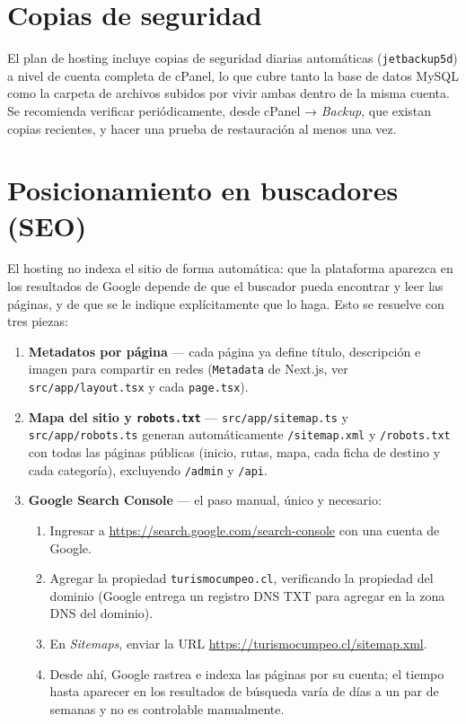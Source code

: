 \documentclass[11pt,a4paper]{article}
\begin{document}
\section{Copias de seguridad}

El plan de hosting incluye copias de seguridad diarias automáticas (\texttt{jetbackup5d}) a nivel de cuenta completa de cPanel, lo que cubre tanto la base de datos MySQL como la carpeta de archivos subidos por vivir ambas dentro de la misma cuenta. Se recomienda verificar periódicamente, desde cPanel → \emph{Backup}, que existan copias recientes, y hacer una prueba de restauración al menos una vez.

\section{Posicionamiento en buscadores (SEO)}

El hosting no indexa el sitio de forma automática: que la plataforma aparezca en los resultados de Google depende de que el buscador pueda encontrar y leer las páginas, y de que se le indique explícitamente que lo haga. Esto se resuelve con tres piezas:

\begin{enumerate}
  \item \textbf{Metadatos por página} — cada página ya define título, descripción e imagen para compartir en redes (\texttt{Metadata} de Next.js, ver \texttt{src/app/layout.tsx} y cada \texttt{page.tsx}).
  \item \textbf{Mapa del sitio y \texttt{robots.txt}} — \texttt{src/app/sitemap.ts} y \texttt{src/app/robots.ts} generan automáticamente \texttt{/sitemap.xml} y \texttt{/robots.txt} con todas las páginas públicas (inicio, rutas, mapa, cada ficha de destino y cada categoría), excluyendo \texttt{/admin} y \texttt{/api}.
  \item \textbf{Google Search Console} — el paso manual, único y necesario:
  \begin{enumerate}
    \item Ingresar a \url{https://search.google.com/search-console} con una cuenta de Google.
    \item Agregar la propiedad \texttt{turismocumpeo.cl}, verificando la propiedad del dominio (Google entrega un registro DNS TXT para agregar en la zona DNS del dominio).
    \item En \emph{Sitemaps}, enviar la URL \url{https://turismocumpeo.cl/sitemap.xml}.
    \item Desde ahí, Google rastrea e indexa las páginas por su cuenta; el tiempo hasta aparecer en los resultados de búsqueda varía de días a un par de semanas y no es controlable manualmente.
  \end{enumerate}
\end{enumerate}
\end{document}

